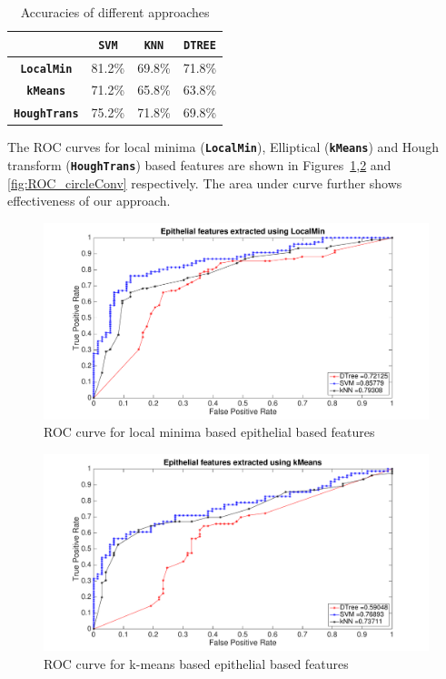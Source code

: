 \begin{table}
\centering
\begin{tabular}{|c|c|c|c| }
\hline
 & \textbf{\texttt{SVM}} & \textbf{\texttt{KNN}} & \textbf{\texttt{DTREE}} \\ \hline
\textbf{\texttt{LocalMin}} & 81.2\% & 69.8\% & 71.8\% \\ \hline
\textbf{\texttt{kMeans}} & 71.2\%  & 65.8\% & 63.8\% \\ \hline
\textbf{ \texttt{HoughTrans}} & 75.2\% & 71.8\% & 69.8\% \\ \hline
\end{tabular}
\caption{\label{table:accuracy}Accuracies of different approaches}
\end{table}

The ROC curves for local minima (\textbf{\texttt{LocalMin}}), Elliptical (\textbf{\texttt{kMeans}}) and Hough transform (\textbf{\texttt{HoughTrans}}) based features are shown in Figures~\ref{fig:ROC_localMin},\ref{fig:ROC_kMeans} and \ref{fig:ROC_circleConv} respectively. The area under curve further shows effectiveness of our approach. 

 

\begin{figure}
\includegraphics[scale=0.2]{figs/ROC_localMin.pdf}
\caption{\label{fig:ROC_localMin}ROC curve for local minima based epithelial based features}
\end{figure}  

\begin{figure}
\includegraphics[scale=0.2]{figs/ROC_kMeans.pdf}
\caption{\label{fig:ROC_kMeans}ROC curve for k-means based epithelial based features}
\end{figure}



